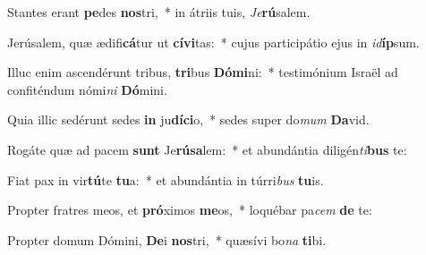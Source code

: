 \item Stantes erant \textbf{pe}des \textbf{nos}tri,~* in átriis tuis, \textit{Je}\textbf{rú}salem.
\item Jerúsalem, quæ ædifi\textbf{cá}tur ut \textbf{cí}\textbf{vi}tas:~* cujus participátio ejus in \textit{id}\textbf{íp}sum.
\item Illuc enim ascendérunt tribus, \textbf{tri}bus \textbf{Dó}\textbf{mi}ni:~* testimónium Israël ad confiténdum nómi\textit{ni} \textbf{Dó}mini.
\item Quia illic sedérunt sedes \textbf{in} ju\textbf{dí}\textbf{ci}o,~* sedes super do\textit{mum} \textbf{Da}vid.
\item Rogáte quæ ad pacem \textbf{sunt} Je\textbf{rú}\textbf{sa}lem:~* et abundántia diligén\textit{ti}\textbf{bus} te:
\item Fiat pax in vir\textbf{tú}te \textbf{tu}a:~* et abundántia in túrri\textit{bus} \textbf{tu}is.
\item Propter fratres meos, et \textbf{pró}ximos \textbf{me}os,~* loquébar pa\textit{cem} \textbf{de} te:
\item Propter domum Dómini, \textbf{De}i \textbf{nos}tri,~* quæsívi bo\textit{na} \textbf{ti}bi.

